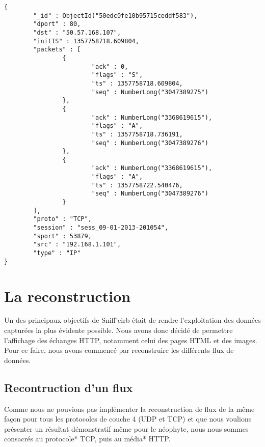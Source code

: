 \begin{verbatim}
{
        "_id" : ObjectId("50edc0fe10b95715ceddf583"),
        "dport" : 80,
        "dst" : "50.57.168.107",
        "initTS" : 1357758718.609804,
        "packets" : [
                {
                        "ack" : 0,
                        "flags" : "S",
                        "ts" : 1357758718.609804,
                        "seq" : NumberLong("3047389275")
                },
                {
                        "ack" : NumberLong("3368619615"),
                        "flags" : "A",
                        "ts" : 1357758718.736191,
                        "seq" : NumberLong("3047389276")
                },
                {
                        "ack" : NumberLong("3368619615"),
                        "flags" : "A",
                        "ts" : 1357758722.540476,
                        "seq" : NumberLong("3047389276")
                }
        ],
        "proto" : "TCP",
        "session" : "sess_09-01-2013-201054",
        "sport" : 53879,
        "src" : "192.168.1.101",
        "type" : "IP"
}

\end{verbatim}

\section{La reconstruction}

Un des principaux objectifs de Sniff'eirb était de rendre l'exploitation des données capturées la plus évidente possible.
Nous avons donc décidé de permettre l'affichage des échanges HTTP, notamment celui des pages HTML et des images. Pour ce
faire, nous avons commencé par reconstruire les différents flux de données.

\subsection{Recontruction d'un flux}

Comme nous ne pouvions pas implémenter la reconstruction de flux de la même façon pour tous les protocoles de couche 4 (UDP et TCP) et
que nous voulions présenter un résultat démonstratif même pour le néophyte, nous nous sommes consacrés au protocole* TCP, puis au média* HTTP.


